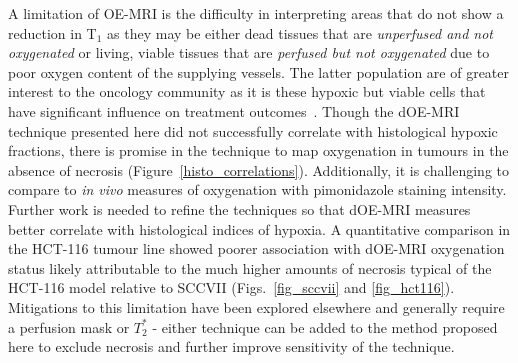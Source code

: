 A limitation of OE-MRI is the difficulty in interpreting areas that do not show a reduction in T$_1$ as they may be either dead tissues that are \textit{unperfused and not oxygenated} or living, viable tissues that are \textit{perfused but not oxygenated} due to poor oxygen content of the supplying vessels. 
The latter population are of greater interest to the oncology community as it is these hypoxic but viable cells that have significant influence on treatment outcomes~\cite{Horsman:2016go}. 
Though the \acs{dOE-MRI} technique presented here did not successfully correlate with histological hypoxic fractions, there is promise in the technique to map oxygenation in tumours in the absence of necrosis (Figure~\ref{histo_correlations}). 
Additionally, it is challenging to compare to \emph{in vivo} measures of oxygenation with pimonidazole staining intensity. 
Further work is needed to refine the techniques so that \acs{dOE-MRI} measures better correlate with histological indices of hypoxia. 
A quantitative comparison in the HCT-116 tumour line showed poorer association with \acs{dOE-MRI} oxygenation status likely attributable to the much higher amounts of necrosis typical of the HCT-116 model relative to SCCVII (Figs.~\ref{fig_sccvii} and \ref{fig_hct116}).
Mitigations to this limitation have been explored elsewhere and generally require a perfusion mask or $T_2^*$ - either technique can be added to the method proposed here to exclude necrosis and further improve sensitivity of the technique.

